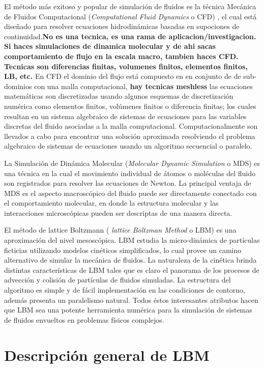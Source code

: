 El método más exitoso y popular de simulación de fluidos es la técnica Mecánica de Fluidos Computacional (\textit{Computational Fluid Dynamics} o CFD) , el cual está diseñado para resolver ecuaciones hidrodinámicas basadas en supociones de continuidad.\textbf{No es una tecnica, es una rama de aplicacion/investigacion. Si haces simulaciones de dinamica molecular y de ahi sacas comportamiento de flujo en la escala macro, tambien haces CFD. Tecnicas son diferencias finitas, volumenes finitos, elementos finitos, LB, etc.}
En CFD el dominio del flujo está compuesto en en conjunto de de sub-dominios con una malla computacional, \textbf{hay tecnicas meshless} las ecuaciones matemáticas son discretizadas usando algunos esquemas de discretización numérica como elementos finitos, volúmenes finitos o diferencia finitas; los cuales resultan en un sistema algebraico de sistemas de ecuaciones para las variables discretas del fluido asociadas a la malla computacional. 
Computacionalmente son llevados a cabo para encontrar una solución aproximada resolviendo el problema algebraico de sistemas de ecuaciones usando un algoritmo secuencial o paralelo.
 
La Simulación de Dinámica Molecular (\textit{Molecular Dynamic Simulation} o MDS) es una técnica en la cual el movimiento individual de átomos o moléculas del fluido son registrados para resolver las ecuaciones de Newton.
La principal ventaja de MDS es el aspecto macroscópico del fluido puede ser directamente conectado con el comportamiento molecular, en donde la estructura molecular y las interacciones microscópicas pueden ser descriptas de una manera directa.

El método de lattice Boltzmann ( \textit{lattice Boltzman Method} o LBM) es una aproximación del nivel mesoscópica. LBM estudia la micro-dinámica de partículas ficticias utilizando modelos cinéticos simplificados, lo cual provee un camino alternativo de simular la mecánica de fluidos. La naturaleza de la cinética brinda distintas características de LBM tales que es claro el panorama de los procesos de advección y colisión de partículas de fluidos simuladas. La estructura del algoritmo es simple y de fácil implementación en las condiciones de contorno, además presenta un paralelismo natural. Todos éstos interesantes atributos hacen que LBM sea una potente herramienta numérica para la simulación de sistemas de fluidos envueltos en problemas físicos complejos\cite{guo2013lattice}. 


\section{Descripción general de LBM}

